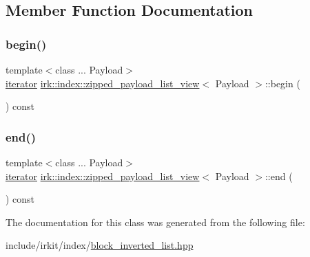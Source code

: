 \subsection{Member Function Documentation}
\mbox{\label{classirk_1_1index_1_1zipped__payload__list__view_aec7df8626683a4f71aa2b733d36d0a4c}} 
\subsubsection{\texorpdfstring{begin()}{begin()}}
{\footnotesize\ttfamily template$<$class ... Payload$>$ \\
\mbox{\hyperlink{classirk_1_1index_1_1zipped__payload__list__view_1_1iterator}{iterator}} \mbox{\hyperlink{classirk_1_1index_1_1zipped__payload__list__view}{irk\+::index\+::zipped\+\_\+payload\+\_\+list\+\_\+view}}$<$ Payload $>$\+::begin (\begin{DoxyParamCaption}{ }\end{DoxyParamCaption}) const\hspace{0.3cm}{\ttfamily [inline]}}

\mbox{\label{classirk_1_1index_1_1zipped__payload__list__view_af10848c654db6e4d0b342fe764c0f77b}} 
\subsubsection{\texorpdfstring{end()}{end()}}
{\footnotesize\ttfamily template$<$class ... Payload$>$ \\
\mbox{\hyperlink{classirk_1_1index_1_1zipped__payload__list__view_1_1iterator}{iterator}} \mbox{\hyperlink{classirk_1_1index_1_1zipped__payload__list__view}{irk\+::index\+::zipped\+\_\+payload\+\_\+list\+\_\+view}}$<$ Payload $>$\+::end (\begin{DoxyParamCaption}{ }\end{DoxyParamCaption}) const\hspace{0.3cm}{\ttfamily [inline]}}



The documentation for this class was generated from the following file\+:\begin{DoxyCompactItemize}
\item 
include/irkit/index/\mbox{\hyperlink{block__inverted__list_8hpp}{block\+\_\+inverted\+\_\+list.\+hpp}}\end{DoxyCompactItemize}
